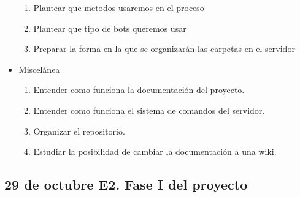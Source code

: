 \documentclass{article}
\theoremstyle{definition}
\begin{document}
\begin{itemize}
\begin{enumerate}
\item Plantear que metodos usaremos en el proceso
\item Plantear que tipo de bots queremos usar
\item Preparar la forma en la que se organizarán las carpetas en el servidor
\end{enumerate}
\item Miscelánea \begin{enumerate}
\item Entender como funciona la documentación del proyecto.
\item Entender como funciona el sistema de comandos del servidor.
\item Organizar el repositorio.
\item Estudiar la posibilidad de cambiar la documentación a una wiki.
\end{enumerate}

\end{itemize}

\subsection{29 de octubre	E2. Fase I del proyecto}
\end{document}
